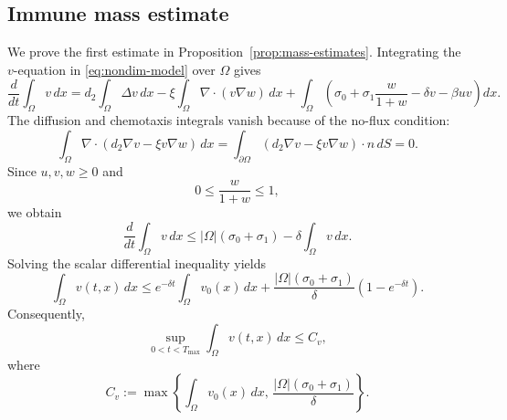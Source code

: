 \documentclass[a4paper,fleqn,longmktitle]{cas-sc}
\theoremstyle{plain}
\theoremstyle{definition}
\numberwithin{equation}{section}
\begin{document}
\subsection{Immune mass estimate}
\label{app:v-mass}
We prove the first estimate in Proposition~\ref{prop:mass-estimates}. Integrating
the $v$-equation in \eqref{eq:nondim-model} over $\Omega$ gives
\[
\frac{d}{dt}\int_\Omega v\,dx
=
d_2\int_\Omega \Delta v\,dx
-\xi\int_\Omega \nabla\cdot(v\nabla w)\,dx
+
\int_\Omega
\left(
\sigma_0+\sigma_1\frac{w}{1+w}-\delta v-\beta uv
\right)dx.
\]
The diffusion and chemotaxis integrals vanish because of the no-flux condition:
\[
\int_\Omega \nabla\cdot(d_2\nabla v-\xi v\nabla w)\,dx
=
\int_{\partial\Omega}(d_2\nabla v-\xi v\nabla w)\cdot n\,dS
=
0.
\]
Since $u,v,w\ge0$ and
\[
0\le \frac{w}{1+w}\le1,
\]
we obtain
\begin{equation}\label{eq:app-v-differential}
\frac{d}{dt}\int_\Omega v\,dx
\le
|\Omega|(\sigma_0+\sigma_1)-\delta\int_\Omega v\,dx.
\end{equation}
Solving the scalar differential inequality yields
\begin{equation}\label{eq:app-v-bound}
\int_\Omega v(t,x)\,dx
\le
e^{-\delta t}\int_\Omega v_0(x)\,dx
+
\frac{|\Omega|(\sigma_0+\sigma_1)}{\delta}
\left(1-e^{-\delta t}\right).
\end{equation}
Consequently,
\begin{equation}\label{eq:app-v-uniform-bound}
\sup_{0<t<T_{\max}}\int_\Omega v(t,x)\,dx
\le
C_v,
\end{equation}
where
\[
C_v
:=
\max\left\{
\int_\Omega v_0(x)\,dx,\,
\frac{|\Omega|(\sigma_0+\sigma_1)}{\delta}
\right\}.
\]
\end{document}
